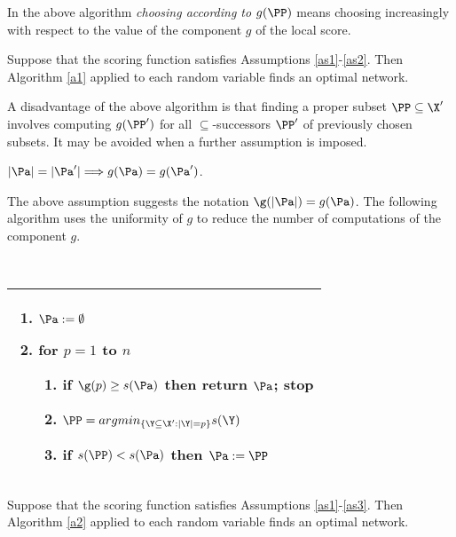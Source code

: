  In the above algorithm \emph{choosing according to $g(\PP)$} means choosing increasingly with respect to the value of the component $g$ of the local score.
 
 \begin{theorem}
 Suppose that the scoring function satisfies Assumptions \ref{as1}-\ref{as2}. Then Algorithm \ref{a1} applied to each random variable finds an optimal network.
 \end{theorem}
 
 A disadvantage of the above algorithm is that finding a proper subset $\PP\subseteq\X'$ involves computing $g(\PP')$ for all $\subseteq$-successors $\PP'$ of previously chosen subsets. 
 It may be avoided when a further assumption is imposed.

\begin{ass}[uniformity]\label{as3}
 $|\Pa|=|\Pa'|\Longrightarrow g(\Pa)=g(\Pa')$.
\end{ass}

 The above assumption suggests the notation $\g(|\Pa|)=g(\Pa)$. 
 The following algorithm uses the uniformity of $g$ to reduce the number of computations of the component $g$.

\begin{alg}\label{a2}~
\begin{center}
\begin{tabular}{|p{}|}\hline
\begin{enumerate}
\item $\Pa:=\emptyset$
\item for $p=1$ to $n$%
\begin{enumerate}
\item if $\g(p)\ge s(\Pa)$ then return $\Pa$; stop
\item $\PP=arg min_{\{\Y\subseteq\X' : |\Y|=p\}}s(\Y)$
\item if $s(\PP)<s(\Pa)$ then $\Pa:=\PP$
\end{enumerate}
\end{enumerate}\\
\hline
\end{tabular}
\end{center}
\end{alg}

 \begin{theorem}
 Suppose that the scoring function satisfies Assumptions \ref{as1}-\ref{as3}. Then Algorithm \ref{a2} applied to each random variable finds an optimal network.
 \end{theorem}
 
